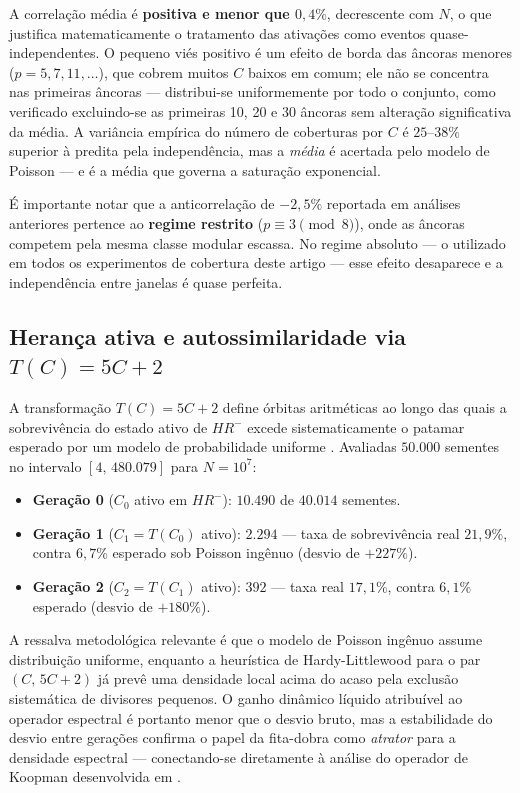 \documentclass[11pt]{article}
\begin{document}
	A correlação média é \textbf{positiva e menor que $0{,}4\%$}, decrescente com $N$, o que justifica matematicamente o tratamento das ativações como eventos quase-independentes. O pequeno viés positivo é um efeito de borda das âncoras menores ($p=5,7,11,\dots$), que cobrem muitos $C$ baixos em comum; ele não se concentra nas primeiras âncoras — distribui-se uniformemente por todo o conjunto, como verificado excluindo-se as primeiras 10, 20 e 30 âncoras sem alteração significativa da média. A variância empírica do número de coberturas por $C$ é $25$–$38\%$ superior à predita pela independência, mas a \emph{média} é acertada pelo modelo de Poisson — e é a média que governa a saturação exponencial.
	
	É importante notar que a anticorrelação de $-2{,}5\%$ reportada em análises anteriores pertence ao \textbf{regime restrito} ($p \equiv 3 \pmod 8$), onde as âncoras competem pela mesma classe modular escassa. No regime absoluto — o utilizado em todos os experimentos de cobertura deste artigo — esse efeito desaparece e a independência entre janelas é quase perfeita.
	
	
	\subsection{Herança ativa e autossimilaridade via $T(C)=5C+2$}
	
	A transformação $T(C)=5C+2$ define órbitas aritméticas ao longo das quais a sobrevivência do estado ativo de $HR^-$ excede sistematicamente o patamar esperado por um modelo de probabilidade uniforme \cite{art9}. Avaliadas $50{.}000$ sementes no intervalo $[4,\,480{.}079]$ para $N=10^7$:
	
	\begin{itemize}
		\item \textbf{Geração 0} ($C_0$ ativo em $HR^-$): $10{.}490$ de $40{.}014$ sementes.
		\item \textbf{Geração 1} ($C_1 = T(C_0)$ ativo): $2{.}294$ — taxa de sobrevivência real $21{,}9\%$, contra $6{,}7\%$ esperado sob Poisson ingênuo (desvio de $+227\%$).
		\item \textbf{Geração 2} ($C_2 = T(C_1)$ ativo): $392$ — taxa real $17{,}1\%$, contra $6{,}1\%$ esperado (desvio de $+180\%$).
	\end{itemize}
	
	A ressalva metodológica relevante é que o modelo de Poisson ingênuo assume distribuição uniforme, enquanto a heurística de Hardy-Littlewood para o par $(C,\,5C+2)$ já prevê uma densidade local acima do acaso pela exclusão sistemática de divisores pequenos. O ganho dinâmico líquido atribuível ao operador espectral é portanto menor que o desvio bruto, mas a estabilidade do desvio entre gerações confirma o papel da fita-dobra como \emph{atrator} para a densidade espectral — conectando-se diretamente à análise do operador de Koopman desenvolvida em \cite{art6}.
	
\end{document}
